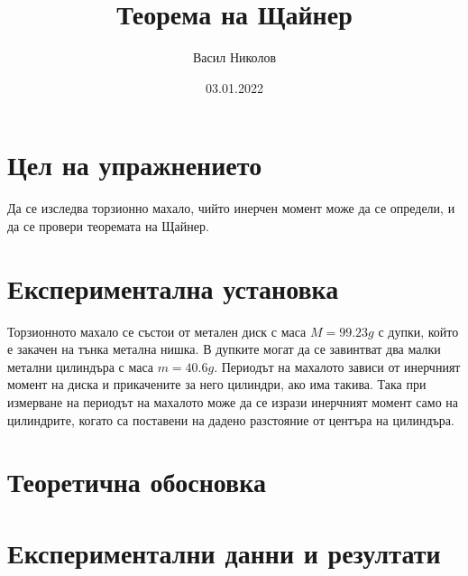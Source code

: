 \documentclass[aps, prb, twocolumn, a4paper, floatfix, reprint]{revtex4-2}
\begin{document}
\title{Теорема на Щайнер}
\author{Васил Николов}
\noaffiliation
\date{03.01.2022}
\maketitle

\section{Цел на упражнението}
Да се изследва торзионно махало, чийто инерчен момент може да се определи, и да се провери теоремата на Щайнер.

\section{Експериментална установка}
Торзионното махало се състои от метален диск с маса $M=99.23g$ с дупки, който е закачен на тънка метална нишка. В дупките могат да се завинтват два малки метални цилиндъра с маса $m=40.6g$. Периодът на махалото зависи от инерчният момент на диска и прикачените за него цилиндри, ако има такива. Така при измерване на периодът на махалото може да се изрази инерчният момент само на цилиндрите, когато са поставени на дадено разстояние от центъра на цилиндъра. 

\section{Теоретична обосновка}


\section{Експериментални данни и резултати}
\end{document}
